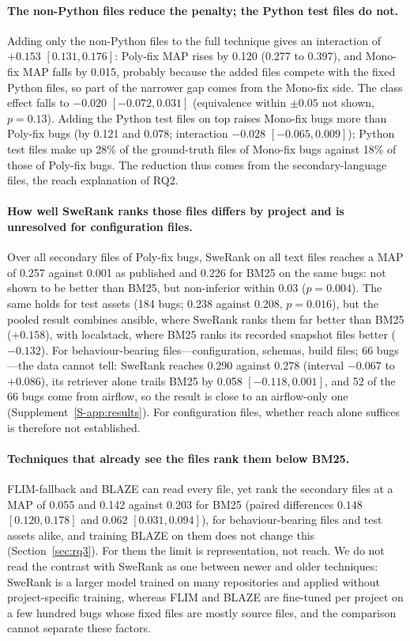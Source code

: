 \documentclass[a4paper,fleqn]{cas-dc}
\begin{document}
\paragraph{The non-Python files reduce the penalty; the Python test files do
not.} Adding only the non-Python files to the full technique gives an
interaction of $+0.153$ $[0.131, 0.176]$: Poly-fix MAP rises by 0.120 (0.277 to
0.397), and Mono-fix MAP falls by 0.015, probably because the added files
compete with the fixed Python files, so part of the narrower gap comes from the Mono-fix
side. The class effect falls to $-0.020$ $[-0.072, 0.031]$ (equivalence within
$\pm0.05$ not shown, $p=0.13$). Adding the Python test files on top raises
Mono-fix bugs more than Poly-fix bugs (by 0.121 and 0.078; interaction
$-0.028$ $[-0.065, 0.009]$); Python test files make up 28\% of the
ground-truth files of Mono-fix bugs against 18\% of those of Poly-fix bugs. The reduction thus comes from the secondary-language
files, the reach explanation of RQ2.

\paragraph{How well SweRank ranks those files differs by project and is
unresolved for configuration files.} Over all
secondary files of Poly-fix bugs, SweRank on all text files reaches a MAP of
0.257 against 0.001 as published and 0.226 for BM25 on the same bugs: not
shown to be better than BM25, but non-inferior within 0.03 ($p=0.004$). The
same holds for test assets (184 bugs; 0.238 against 0.208, $p=0.016$), but
the pooled result combines ansible, where SweRank ranks them far better than
BM25 ($+0.158$), with localstack, where BM25 ranks its recorded snapshot files
better ($-0.132$). For behaviour-bearing files---configuration, schemas,
build files; 66 bugs---the data cannot tell: SweRank reaches 0.290 against
0.278 (interval $-0.067$ to $+0.086$), its retriever alone trails BM25 by
0.058 $[-0.118, 0.001]$, and 52 of the 66 bugs come from airflow, so the
result is close to an airflow-only one (Supplement~\ref{S-app:results}). For
configuration files, whether reach alone suffices is therefore not
established.

\paragraph{Techniques that already see the files rank them below BM25.}
FLIM-fallback and BLAZE can read every file, yet rank the secondary files at a
MAP of 0.055 and 0.142 against 0.203 for BM25 (paired differences $0.148$
$[0.120, 0.178]$ and $0.062$ $[0.031, 0.094]$), for behaviour-bearing files and
test assets alike, and training BLAZE on them does not change this
(Section~\ref{sec:rq3}). For them the limit is representation, not reach. We do not read the contrast with SweRank as one between newer and older
techniques: SweRank is a larger model trained on many repositories and applied
without project-specific training, whereas FLIM and BLAZE are fine-tuned per
project on a few hundred bugs whose fixed files are mostly source files, and
the comparison cannot separate these factors.
\end{document}
